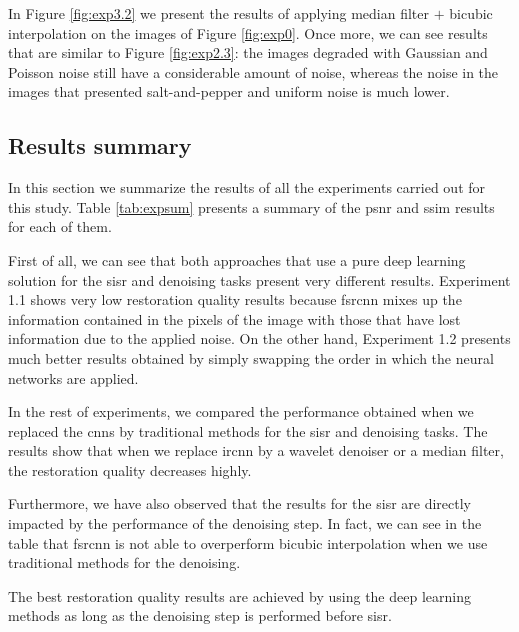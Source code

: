 In Figure \ref{fig:exp3.2} we present the results of applying median filter $+$ bicubic interpolation on the images of Figure \ref{fig:exp0}. Once more, we can see results that are similar to Figure \ref{fig:exp2.3}: the images degraded with Gaussian and Poisson noise still have a considerable amount of noise, whereas the noise in the images that presented salt-and-pepper and uniform noise is much lower.

\subsection{Results summary}
In this section we summarize the results of all the experiments carried out for this study. Table \ref{tab:expsum} presents a summary of the \gls{psnr} and \gls{ssim} results for each of them.

First of all, we can see that both approaches that use a pure deep learning solution for the \gls{sisr} and denoising tasks present very different results. Experiment 1.1 shows very low restoration quality results because \gls{fsrcnn} mixes up the information contained in the pixels of the image with those that have lost information due to the applied noise. On the other hand, Experiment 1.2 presents much better results obtained by simply swapping the order in which the neural networks are applied.

In the rest of experiments, we compared the performance obtained when we replaced the \glspl{cnn} by traditional methods for the \gls{sisr} and denoising tasks. The results show that when we replace \gls{ircnn} by a wavelet denoiser or a median filter, the restoration quality decreases highly.

Furthermore, we have also observed that the results for the \gls{sisr} are directly impacted by the performance of the denoising step. In fact, we can see in the table that \gls{fsrcnn} is not able to overperform bicubic interpolation when we use traditional methods for the denoising.

The best restoration quality results are achieved by using the deep learning methods as long as the denoising step is performed before \gls{sisr}.


